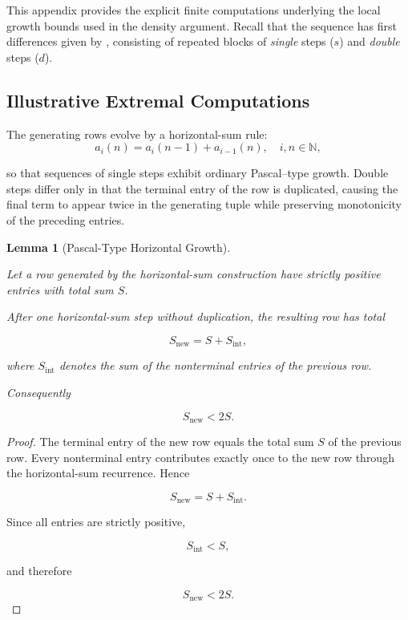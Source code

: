 \documentclass[12pt, oneside]{article}
\numberwithin{equation}{section}
\theoremstyle{definition}
\theoremstyle{plain}
\newtheorem{lemma}[theorem]{Lemma}
\theoremstyle{remark}
\begin{document}
This appendix provides the explicit finite computations underlying the local
growth bounds used in the density argument. Recall that the sequence 
has first differences given by , consisting of repeated blocks of
\emph{single} steps ($s$) and \emph{double} steps ($d$).

\subsection{Illustrative Extremal Computations}

The generating rows evolve by a horizontal-sum rule:
\begin{equation}
a_i(n) = a_i(n-1) + a_{i-1}(n), \quad i,n \in \mathbb{N},
\end{equation}

so that sequences of single steps exhibit ordinary Pascal--type growth.
Double steps differ only in that the terminal entry of the row is duplicated,
causing the final term to appear twice in the generating tuple while preserving
monotonicity of the preceding entries.

\begin{lemma}[Pascal-Type Horizontal Growth]
\label{lem:pascal-growth}

Let a row generated by the horizontal-sum construction have strictly positive entries
with total sum $S$.

After one horizontal-sum step without duplication, the resulting row has total

\[
S_{\mathrm{new}}
=
S+S_{\mathrm{int}},
\]

where $S_{\mathrm{int}}$ denotes the sum of the nonterminal entries of the
previous row.

Consequently

\[
S_{\mathrm{new}} < 2S.
\]

\end{lemma}

\begin{proof}

The terminal entry of the new row equals the total sum $S$ of the previous row.
Every nonterminal entry contributes exactly once to the new row through the
horizontal-sum recurrence. Hence

\[
S_{\mathrm{new}}
=
S+S_{\mathrm{int}}.
\]

Since all entries are strictly positive,

\[
S_{\mathrm{int}}<S,
\]

and therefore

\[
S_{\mathrm{new}}<2S.
\]

\end{proof}
\end{document}
